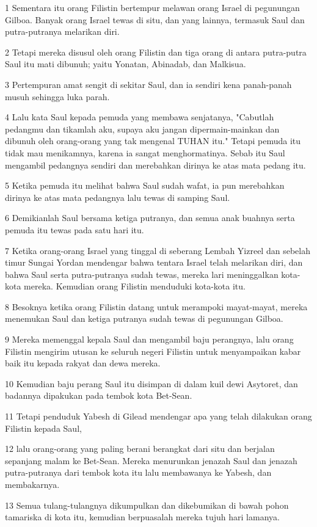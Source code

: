 \par 1 Sementara itu orang Filistin bertempur melawan orang Israel di pegunungan Gilboa. Banyak orang Israel tewas di situ, dan yang lainnya, termasuk Saul dan putra-putranya melarikan diri.
\par 2 Tetapi mereka disusul oleh orang Filistin dan tiga orang di antara putra-putra Saul itu mati dibunuh; yaitu Yonatan, Abinadab, dan Malkisua.
\par 3 Pertempuran amat sengit di sekitar Saul, dan ia sendiri kena panah-panah musuh sehingga luka parah.
\par 4 Lalu kata Saul kepada pemuda yang membawa senjatanya, "Cabutlah pedangmu dan tikamlah aku, supaya aku jangan dipermain-mainkan dan dibunuh oleh orang-orang yang tak mengenal TUHAN itu." Tetapi pemuda itu tidak mau menikamnya, karena ia sangat menghormatinya. Sebab itu Saul mengambil pedangnya sendiri dan merebahkan dirinya ke atas mata pedang itu.
\par 5 Ketika pemuda itu melihat bahwa Saul sudah wafat, ia pun merebahkan dirinya ke atas mata pedangnya lalu tewas di samping Saul.
\par 6 Demikianlah Saul bersama ketiga putranya, dan semua anak buahnya serta pemuda itu tewas pada satu hari itu.
\par 7 Ketika orang-orang Israel yang tinggal di seberang Lembah Yizreel dan sebelah timur Sungai Yordan mendengar bahwa tentara Israel telah melarikan diri, dan bahwa Saul serta putra-putranya sudah tewas, mereka lari meninggalkan kota-kota mereka. Kemudian orang Filistin menduduki kota-kota itu.
\par 8 Besoknya ketika orang Filistin datang untuk merampoki mayat-mayat, mereka menemukan Saul dan ketiga putranya sudah tewas di pegunungan Gilboa.
\par 9 Mereka memenggal kepala Saul dan mengambil baju perangnya, lalu orang Filistin mengirim utusan ke seluruh negeri Filistin untuk menyampaikan kabar baik itu kepada rakyat dan dewa mereka.
\par 10 Kemudian baju perang Saul itu disimpan di dalam kuil dewi Asytoret, dan badannya dipakukan pada tembok kota Bet-Sean.
\par 11 Tetapi penduduk Yabesh di Gilead mendengar apa yang telah dilakukan orang Filistin kepada Saul,
\par 12 lalu orang-orang yang paling berani berangkat dari situ dan berjalan sepanjang malam ke Bet-Sean. Mereka menurunkan jenazah Saul dan jenazah putra-putranya dari tembok kota itu lalu membawanya ke Yabesh, dan membakarnya.
\par 13 Semua tulang-tulangnya dikumpulkan dan dikebumikan di bawah pohon tamariska di kota itu, kemudian berpuasalah mereka tujuh hari lamanya.


